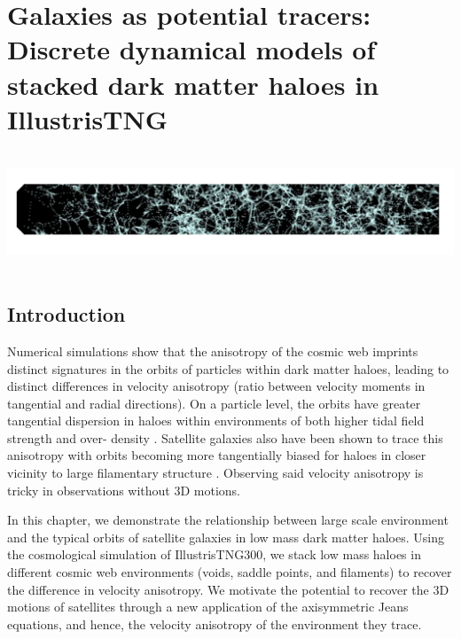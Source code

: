 \chapter[Discrete dynamical models of stacked dark matter haloes]{Galaxies as potential tracers: \\ Discrete dynamical models of stacked dark matter haloes in IllustrisTNG}
\label{ch:dyn_mod}
\vspace{-5.25in}
\includegraphics[height=1.39in]{thesis/latex/dyn_mod_files/tngcw_heading.pdf}
\vspace{3in}


\section{Introduction}
Numerical simulations show that the anisotropy of the cosmic web imprints distinct signatures in the orbits of particles within dark matter haloes, leading to distinct differences in velocity anisotropy (ratio between velocity moments in tangential and radial directions). On a particle level, the orbits have greater tangential dispersion in haloes within environments of both higher tidal field strength and over- density \citep[e.g.][]{faltenbacher2010, shi2015}. Satellite galaxies also have been shown to trace this anisotropy with orbits becoming more tangentially biased for haloes in closer vicinity to large filamentary structure \citep[][]{garaldi2018}. Observing said velocity anisotropy is tricky in observations without 3D motions.

In this chapter, we demonstrate the relationship between large scale environment and the typical orbits of satellite galaxies in low mass dark matter haloes. Using the cosmological simulation of IllustrisTNG300, we stack low mass haloes in different cosmic web environments (voids, saddle points, and filaments) to recover the difference in velocity anisotropy. We motivate the potential to recover the 3D motions of satellites through a new application of the axisymmetric Jeans equations, and hence, the velocity anisotropy of the environment they trace.

